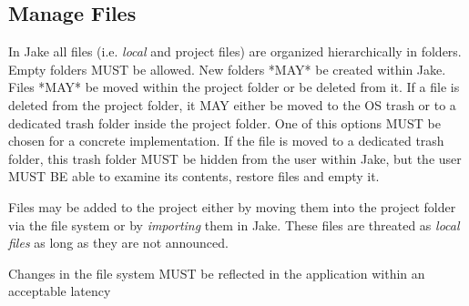 \subsection{Manage Files}
In Jake all files (i.e. \emph{local} and {project files}) are organized hierarchically in folders. Empty folders MUST be allowed. New folders *MAY* be created within Jake. Files *MAY* be moved within the project folder or be deleted from it. If a file is deleted from the project folder, it MAY either be moved to the OS trash or to a dedicated trash folder inside the project folder. One of this options MUST be chosen for a concrete implementation. If the file is moved to a dedicated trash folder, this trash folder MUST be hidden from the user within Jake, but the user MUST BE able to examine its contents, restore files and empty it.

Files may be added to the project either by moving them into the project folder via the file system or by \emph{importing} them in Jake.
These files are threated as \emph{local files} as long as they are not announced. 

Changes in the file system MUST be reflected in the application within an acceptable latency

